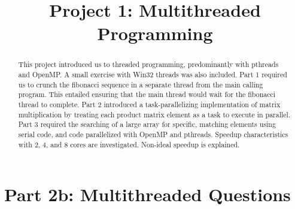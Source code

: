 \documentclass[conference]{IEEEtran}
\begin{document}
\title{Project 1: Multithreaded Programming}
\author{
}

%
{}

\maketitle

\begin{abstract}
This project introduced us to threaded programming, predominantly 
with pthreads and OpenMP. A small exercise with Win32 threads was also 
included. Part 1 required us to crunch the fibonacci sequence in a separate 
thread from the main calling program. This entailed ensuring that the 
main thread would wait for the fibonacci thread to complete. Part 2 
introduced a task-parallelizing implementation of matrix multiplication by 
treating each product matrix element as a task to execute in parallel. Part 3 
required the searching of a large array for specific, matching elements using 
serial code, and code parallelized with OpenMP and pthreads. Speedup 
characteristics with 2, 4, and 8 cores are investigated. Non-ideal speedup is 
explained.
\end{abstract}

\tableofcontents

\section{Part 2b: Multithreaded Questions}
\end{document}

